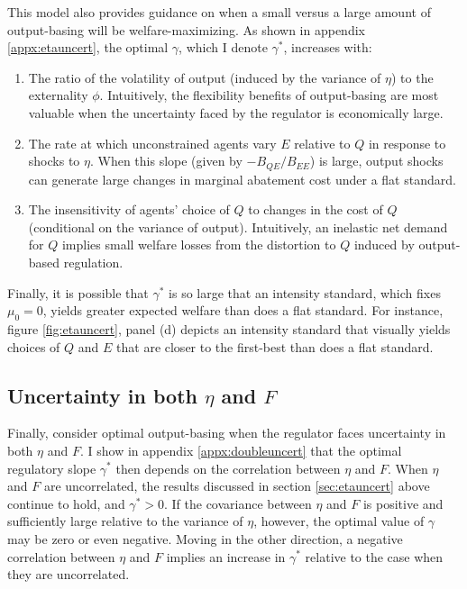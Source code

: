 \documentclass[12pt]{article}
\begin{document}
This model also provides guidance on when a small versus a large amount of output-basing will be welfare-maximizing. As shown in appendix \ref{appx:etauncert}, the optimal $\gamma$, which I denote $\gamma^*$, increases with:
\begin{enumerate}
\item The ratio of the volatility of output (induced by the variance of $\eta$) to the externality $\phi$. Intuitively, the flexibility benefits of output-basing are most valuable when the uncertainty faced by the regulator is economically large.
\item The rate at which unconstrained agents vary $E$ relative to $Q$ in response to shocks to $\eta$. When this slope (given by $-B_{QE}/B_{EE}$) is large, output shocks can generate large changes in marginal abatement cost under a flat standard.
\item The insensitivity of agents' choice of $Q$ to changes in the cost of $Q$ (conditional on the variance of output). Intuitively, an inelastic net demand for $Q$ implies small welfare losses from the distortion to $Q$ induced by output-based regulation.
\end{enumerate}

Finally, it is possible that $\gamma^*$ is so large that an intensity standard, which fixes $\mu_0=0$, yields greater expected welfare than does a flat standard. For instance, figure \ref{fig:etauncert}, panel (d) depicts an intensity standard that visually yields choices of $Q$ and $E$ that are closer to the first-best than does a flat standard.



\subsection{Uncertainty in both $\eta$ and $F$} \label{sec:etaFuncert}

Finally, consider optimal output-basing when the regulator faces uncertainty in both $\eta$ and $F$. I show in appendix \ref{appx:doubleuncert} that the optimal regulatory slope $\gamma^*$ then depends on the correlation between $\eta$ and $F$. When $\eta$ and $F$ are uncorrelated, the results discussed in section \ref{sec:etauncert} above continue to hold, and  $\gamma^*>0$. If the covariance between $\eta$ and $F$ is positive and sufficiently large relative to the variance of $\eta$, however, the optimal value of $\gamma$ may be zero or even negative. Moving in the other direction, a negative correlation between $\eta$ and $F$ implies an increase in $\gamma^*$ relative to the case when they are uncorrelated. 
\end{document}
